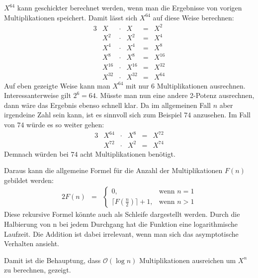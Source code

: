 \documentclass[10pt,a4paper,oneside,ngerman,numbers=noenddot]{scrartcl}
\begin{document}
\section{} %
	\subsection{} %
	
	\subsection{} %
	$X^{64}$ kann geschickter berechnet werden, wenn man die Ergebnisse von vorigen Multiplikationen speichert. Damit lässt sich $X^{64}$ auf diese Weise berechnen:\\
	\begin{alignat*}{3}
	& X &\cdot & X &=& X^{2} \\
	& X^{2} &\cdot & X^{2} &=& X^{4} \\
	& X^{4} &\cdot & X^{4} &=& X^{8} \\
	& X^{8} &\cdot & X^{8} &=& X^{16} \\
	& X^{16} &\cdot & X^{16} &=& X^{32} \\
	& X^{32} &\cdot & X^{32} &=& X^{64}
	\end{alignat*}
	Auf eben gezeigte Weise kann man $X^{64}$ mit nur $6$ Multiplikationen ausrechnen. Interessanterweise gilt $2^{6} = 64$. Müsste man nun eine andere 2-Potenz ausrechnen, dann wäre das Ergebnis ebenso schnell klar. Da im allgemeinen Fall $n$ aber irgendeine Zahl sein kann, ist es sinnvoll sich zum Beispiel $74$ anzusehen. Im Fall von $74$ würde es so weiter gehen:
	\begin{alignat*}{3}
	& X^{64} &\cdot & X^{8} &=& X^{72} \\
	& X^{72} &\cdot & X^{2} &=& X^{74}
	\end{alignat*}
	Demnach würden bei $74$ acht Multiplikationen benötigt.
	
	Daraus kann die allgemeine Formel für die Anzahl der Multiplikationen $F(n)$ gebildet werden:\\
	\begin{alignat*}{2}
	F(n) &=& \begin{cases}
  0,  & \text{wenn } n = 1\\
  \lceil F(\frac{n}{2}) \rceil + 1, & \text{wenn } n > 1
		\end{cases}
	\end{alignat*}
	Diese rekursive Formel könnte auch als Schleife dargestellt werden. Durch die Halbierung von n bei jedem Durchgang hat die Funktion eine logarithmische Laufzeit. Die Addition ist dabei irrelevant, wenn man sich das asymptotische Verhalten ansieht.
	
	Damit ist die Behauptung, dass $\mathcal{O}(\log n)$ Multiplikationen ausreichen um $X^{n}$ zu berechnen, gezeigt.
	\subsection{} %
\end{document}
